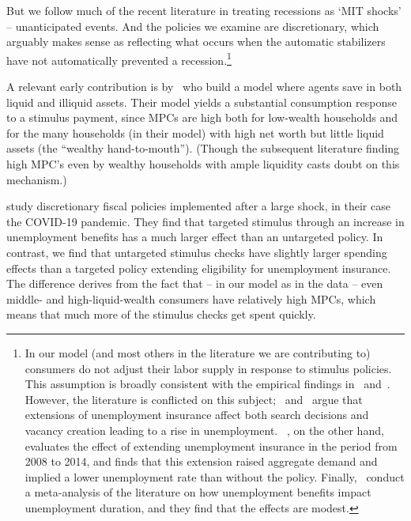 \documentclass[qe]{econsocart}
\begin{document}
But we follow much of the recent literature in treating recessions as `MIT shocks' -- unanticipated events. And the policies we examine are discretionary, which arguably makes sense as reflecting what occurs when the automatic stabilizers have not automatically prevented a recession.\footnote{
  In our model (and most others in the literature we are contributing to) consumers do not adjust their labor supply in response to stimulus policies. 
  This assumption is broadly consistent with the empirical findings in~\cite{ganong2022spending} and~\cite{chodorow2016limited}.
  However, the literature is conflicted on this subject;~\cite{hmmUnemployment} and~\cite{hagedorn2019unemployment} argue that extensions of unemployment insurance affect both search decisions and vacancy creation leading to a rise in unemployment.
  ~\cite{kekre2022unemp}, on the other hand, evaluates the effect of extending unemployment insurance in the period from 2008 to 2014, and finds that this extension raised aggregate demand and implied a lower unemployment rate than without the policy.
  Finally,~\cite{cohenDisemployment} conduct a meta-analysis of the literature on how unemployment benefits impact unemployment duration, and they find that the effects are modest.}

A relevant early contribution is by~\cite{kaplan2014model} who build a model where agents save in both liquid and illiquid assets. %
Their model yields a substantial consumption response to a stimulus payment, since MPCs are high both for low-wealth households and for the many households (in their model) with high net worth but little liquid assets (the ``wealthy hand-to-mouth'').  (Though the subsequent literature finding high MPC's even by wealthy households with ample liquidity casts doubt on this mechanism.)

\cite{bayercoronavirus} study discretionary fiscal policies implemented after a large shock, in their case the COVID-19 pandemic. %
They find that targeted stimulus through an increase in unemployment benefits has a much larger effect than an untargeted policy.
In contrast, we find that untargeted stimulus checks have slightly larger spending effects than a targeted policy extending eligibility for unemployment insurance. %
The difference derives from the fact that -- in our model as in the data -- even middle- and high-liquid-wealth consumers have relatively high MPCs, which means that much more of the stimulus checks get spent quickly.
\end{document}
